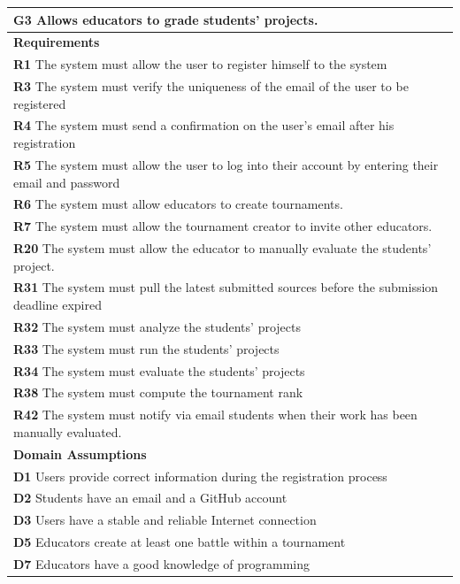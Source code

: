 \begin{table}[H]
    \begin{tabularx}{\textwidth}{X}
        \toprule
        \textbf{G3} Allows educators to grade students' projects.                                                    \\ \midrule
        \textbf{Requirements}                                                                                                        \\ \midrule
        \textbf{R1} The system must allow the user to register himself to the system                                                     \\
        \textbf{R3} The system must verify the uniqueness of the email of the user to be registered                                       \\ 
        \textbf{R4} The system must send a confirmation on the user's email after his registration                         \\
        \textbf{R5} The system must allow the user to log into their account by entering their email and password           \\
        \textbf{R6} The system must allow educators to create tournaments.              \\
        \textbf{R7} The system must allow the tournament creator to invite other educators.         \\  
        \textbf{R20} The system must allow the educator to manually evaluate the students' project.          \\ 
        \textbf{R31} The system must pull the latest submitted sources before the submission deadline expired     \\ 
        \textbf{R32} The system must analyze the students' projects      \\ 
        \textbf{R33} The system must run the students' projects      \\
        \textbf{R34} The system must evaluate the students' projects     \\ 
        \textbf{R38} The system must compute the tournament rank                 \\ 
        \textbf{R42} The system must notify via email students when their work has been manually evaluated. \\
        \midrule
        \textbf{Domain Assumptions}                                                                                                  \\ \midrule
        \textbf{D1} Users provide correct information during the registration process \\           
        \textbf{D2} Students have an email and a GitHub account     \\
        \textbf{D3} Users have a stable and reliable Internet connection \\
        \textbf{D5} Educators create at least one battle within a tournament        \\
        \textbf{D7} Educators have a good knowledge of programming      \\
        \bottomrule
    \end{tabularx}
\end{table}

